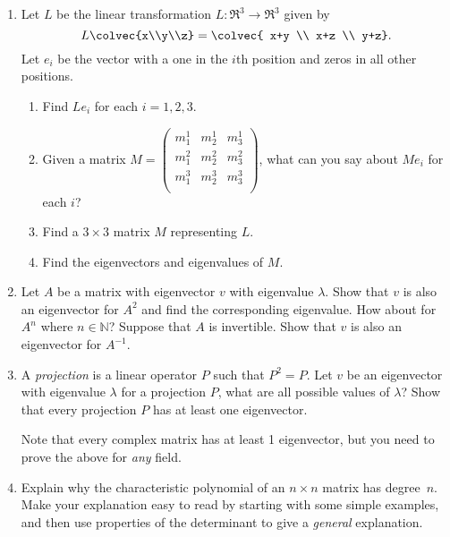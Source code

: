 \begin{enumerate}
\item Let $L$ be the linear transformation $L \colon \Re^3\rightarrow \Re^3$ given by 
\[L\colvec{x\\y\\z}=\colvec{ x+y \\  x+z \\ y+z}.\]  
Let $e_i$ be the vector with a one in the $i$th position and zeros in all other positions.
\begin{enumerate}
\item Find $Le_i$ for each $i=1,2,3$.
\item Given a matrix $M=\begin{pmatrix}
m^1_1 & m^1_2 & m^1_3\\
m^2_1 & m^2_2 & m^2_3\\
m^3_1 & m^3_2 & m^3_3\\
\end{pmatrix}$, what can you say about $Me_i$ for each $i$?
\item Find a $3\times 3$ matrix $M$ representing $L$.  
\item Find the eigenvectors and eigenvalues of \(M.\)

\end{enumerate}


\item Let $A$ be a matrix with eigenvector $v$ with eigenvalue $\lambda$. Show that $v$ is also an eigenvector for $A^2$ and find the corresponding eigenvalue. How about for $A^n$ where $n \in \mathbb{N}$? Suppose that $A$ is invertible. Show that $v$ is also an eigenvector for $A^{-1}$.

\item A \emph{projection} is a linear operator $P$ such that $P^2 = P$. Let $v$ be an eigenvector with eigenvalue $\lambda$ for a projection $P$, what are all possible values of $\lambda$? Show that every projection $P$ has at least one eigenvector.

Note that every complex matrix has at least 1 eigenvector, but you need to prove the above for \emph{any} field.


\item Explain why the characteristic polynomial of an $n\times n$ matrix has degree~$n$.  Make your explanation easy to read by starting with some simple examples, and then use properties of the determinant to give a \emph{general} explanation.


\end{enumerate}
